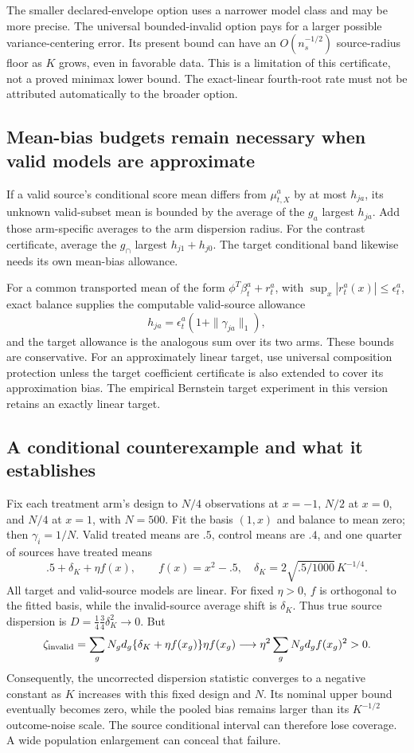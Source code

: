 The smaller declared-envelope option uses a narrower model class and may be
more precise. The universal bounded-invalid option pays for a larger possible
variance-centering error. Its present bound can have an $O(n_s^{-1/2})$
source-radius floor as $K$ grows, even in favorable data. This is a limitation
of this certificate, not a proved minimax lower bound. The exact-linear
fourth-root rate must not be attributed automatically to the broader option.

\subsection{Mean-bias budgets remain necessary when valid models are approximate}

If a valid source's conditional score mean differs from $\mu_{t,X}^a$ by at
most $h_{ja}$, its unknown valid-subset mean is bounded by the average of the
$g_a$ largest $h_{ja}$. Add those arm-specific averages to the arm dispersion
radius. For the contrast certificate, average the $g_\cap$ largest
$h_{j1}+h_{j0}$. The target conditional band likewise needs its own mean-bias
allowance.

For a common transported mean of the form $\phi^T\beta_t^a+r_t^a$, with
$\sup_x|r_t^a(x)|\le\epsilon_t^a$, exact balance supplies the computable
valid-source allowance
\[
 h_{ja}=\epsilon_t^a(1+\|\gamma_{ja}\|_1),
\]
and the target allowance is the analogous sum over its two arms. These bounds
are conservative. For an approximately linear target, use universal composition
protection unless the target coefficient certificate is also extended to cover
its approximation bias. The empirical Bernstein target experiment in this
version retains an exactly linear target.

\subsection{A conditional counterexample and what it establishes}

Fix each treatment arm's design to $N/4$ observations at $x=-1$, $N/2$ at
$x=0$, and $N/4$ at $x=1$, with $N=500$. Fit the basis $(1,x)$ and balance
to mean zero; then $\gamma_i=1/N$. Valid treated means are $.5$, control means
are $.4$, and one quarter of sources have treated means
\[
 .5+\delta_K+\eta f(x),\qquad f(x)=x^2-.5,\quad
 \delta_K=2\sqrt{.5/1000}\,K^{-1/4}.
\]
All target and valid-source models are linear. For fixed $\eta>0$, $f$ is
orthogonal to the fitted basis, while the invalid-source average shift is
$\delta_K$. Thus true source dispersion is
$D=\tfrac14\tfrac34\delta_K^2\to0$. But
\[
 \zeta_{\rm invalid}
 =\sum_g N_g d_g\{\delta_K+\eta f(x_g)\}\eta f(x_g)
 \longrightarrow \eta^2\sum_gN_gd_g f(x_g)^2>0.
\]
Consequently, the uncorrected dispersion statistic converges to a negative
constant as $K$ increases with this fixed design and $N$. Its nominal upper
bound eventually becomes zero, while the pooled bias remains larger than its
$K^{-1/2}$ outcome-noise scale. The source conditional interval can therefore
lose coverage. A wide population enlargement can conceal that failure.


